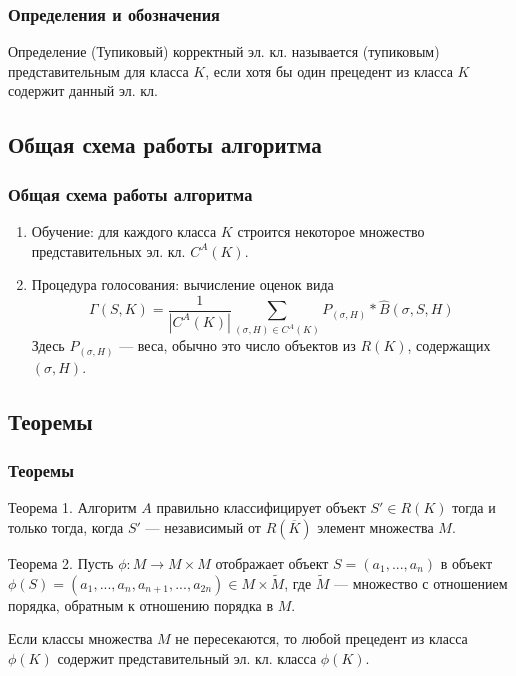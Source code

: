 \documentclass[
	11pt,
]{beamer}
\begin{document}
\begin{frame}
	\frametitle{Определения и обозначения}

	\begin{block}{Определение}
		(Тупиковый) корректный эл. кл. называется (тупиковым) представительным для класса $K$, если хотя бы один прецедент из класса $K$ содержит данный эл. кл.
	\end{block}
\end{frame}

\subsection{Общая схема работы алгоритма}

\begin{frame}
	\frametitle{Общая схема работы алгоритма}

	\begin{enumerate}
		\item Обучение: для каждого класса $K$ строится некоторое множество представительных эл. кл. $C^A(K)$.
		\item Процедура голосования: вычисление оценок вида
			  $$\Gamma(S, K) = \frac{1}{|C^A(K)|} \sum_{(\sigma, H) \in C^A(K)} P_{(\sigma, H)} * \hat{B}(\sigma, S, H)$$
			  Здесь $P_{(\sigma, H)}$ — веса, обычно это число объектов из $R(K)$, содержащих $(\sigma, H)$.
	\end{enumerate}
\end{frame}

\subsection{Теоремы}

\begin{frame}
	\frametitle{Теоремы}
	
	\begin{block}{Теорема 1.}
		Алгоритм $A$ правильно классифицирует объект $S' \in R(K)$ тогда и только тогда, когда $S'$ — независимый от $R(\overline{K})$ элемент множества $M$.
	\end{block}

	\begin{block}{Теорема 2.}
		Пусть $\phi: M \rightarrow M \times M$ отображает объект $S = (a_1, ..., a_n)$ в объект $\phi(S) = (a_1, ..., a_n, a_{n+1}, ..., a_{2n}) \in M \times \tilde{M}$, где $\tilde{M}$ — множество с отношением порядка, обратным к отношению порядка в $M$.

		Если классы множества $M$ не пересекаются, то любой прецедент из класса $\phi(K)$ содержит представительный эл. кл. класса $\phi(K)$.
	\end{block}

\end{frame}
\end{document}
